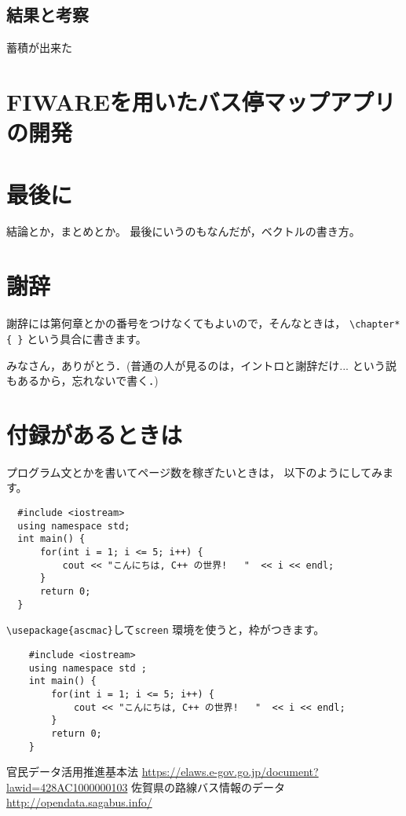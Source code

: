 \documentclass[a4paper, 12pt]{jsreport}
\begin{document}
  \section{結果と考察}
  \par 蓄積が出来た

  \chapter{FIWAREを用いたバス停マップアプリの開発}


  \chapter{最後に}
  結論とか，まとめとか。 最後にいうのもなんだが，ベクトルの書き方。

  \chapter*{謝辞}


  謝辞には第何章とかの番号をつけなくてもよいので，そんなときは，
  \verb|\chapter*{ }| という具合に書きます。

  みなさん，ありがとう．(普通の人が見るのは，イントロと謝辞だけ...
  という説もあるから，忘れないで書く．)

  \appendix
  \chapter{付録があるときは}
  プログラム文とかを書いてページ数を稼ぎたいときは， 以下のようにしてみます。

  \begin{verbatim}
  #include <iostream>
  using namespace std;
  int main() {
      for(int i = 1; i <= 5; i++) {
          cout << "こんにちは, C++ の世界!   "  << i << endl;
      }
      return 0;
  }
  \end{verbatim}
  \verb|\usepackage{ascmac}|して\verb|screen| 環境を使うと，枠がつきます。
  \begin{screen}
    \begin{verbatim}
    #include <iostream>
    using namespace std ;
    int main() {
        for(int i = 1; i <= 5; i++) {
            cout << "こんにちは, C++ の世界!   "  << i << endl;
        }
        return 0;
    }
    \end{verbatim}
  \end{screen}

  \begin{thebibliography}{99}
     官民データ活用推進基本法 \url{https://elaws.e-gov.go.jp/document?lawid=428AC1000000103}
     佐賀県の路線バス情報のデータ \url{http://opendata.sagabus.info/}
  \end{thebibliography}
\end{document}
